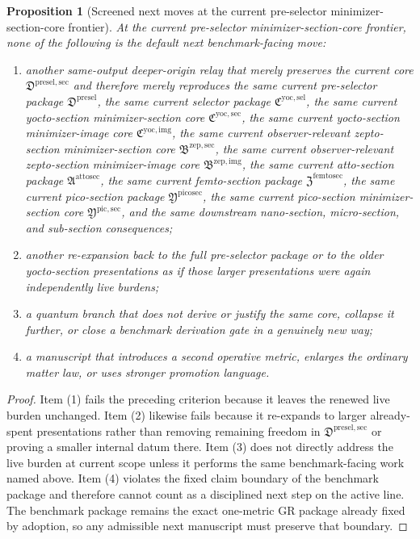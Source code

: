 \documentclass[11pt]{article}
\newcommand{\PreSelectorPackage}{\mathfrak D^{\mathrm{presel}}}
\newcommand{\PreSelectorMinSectionCore}{\mathfrak D^{\mathrm{presel,sec}}}
\newcommand{\YoctoSelectorPackage}{\mathfrak C^{\mathrm{yoc,sel}}}
\newcommand{\YoctoImageCore}{\mathfrak C^{\mathrm{yoc,img}}}
\newcommand{\YoctoMinSectionCore}{\mathfrak C^{\mathrm{yoc,sec}}}
\newcommand{\ZeptoImageCore}{\mathfrak B^{\mathrm{zep,img}}}
\newcommand{\ZeptoMinSectionCore}{\mathfrak B^{\mathrm{zep,sec}}}
\newcommand{\AttoSectionPackage}{\mathfrak A^{\mathrm{attosec}}}
\newcommand{\FemtoSectionPackage}{\mathfrak Z^{\mathrm{femtosec}}}
\newcommand{\PicoSectionPackage}{\mathfrak Y^{\mathrm{picosec}}}
\newcommand{\PicoMinSectionCore}{\mathfrak Y^{\mathrm{pic,sec}}}
\newtheorem{proposition}{Proposition}
\begin{document}
\begin{proposition}[Screened next moves at the current pre-selector minimizer-section-core frontier]
At the current pre-selector minimizer-section-core frontier, none of the following is the default next benchmark-facing move:
\begin{enumerate}
    \item another same-output deeper-origin relay that merely preserves the current core \(\PreSelectorMinSectionCore\) and therefore merely reproduces the same current pre-selector package \(\PreSelectorPackage\), the same current selector package \(\YoctoSelectorPackage\), the same current yocto-section minimizer-section core \(\YoctoMinSectionCore\), the same current yocto-section minimizer-image core \(\YoctoImageCore\), the same current observer-relevant zepto-section minimizer-section core \(\ZeptoMinSectionCore\), the same current observer-relevant zepto-section minimizer-image core \(\ZeptoImageCore\), the same current atto-section package \(\AttoSectionPackage\), the same current femto-section package \(\FemtoSectionPackage\), the same current pico-section package \(\PicoSectionPackage\), the same current pico-section minimizer-section core \(\PicoMinSectionCore\), and the same downstream nano-section, micro-section, and sub-section consequences;
    \item another re-expansion back to the full pre-selector package or to the older yocto-section presentations as if those larger presentations were again independently live burdens;
    \item a quantum branch that does not derive or justify the same core, collapse it further, or close a benchmark derivation gate in a genuinely new way;
    \item a manuscript that introduces a second operative metric, enlarges the ordinary matter law, or uses stronger promotion language.
\end{enumerate}
\end{proposition}

\begin{proof}
Item (1) fails the preceding criterion because it leaves the renewed live burden unchanged. Item (2) likewise fails because it re-expands to larger already-spent presentations rather than removing remaining freedom in \(\PreSelectorMinSectionCore\) or proving a smaller internal datum there. Item (3) does not directly address the live burden at current scope unless it performs the same benchmark-facing work named above. Item (4) violates the fixed claim boundary of the benchmark package and therefore cannot count as a disciplined next step on the active line. The benchmark package remains the exact one-metric GR package already fixed by adoption, so any admissible next manuscript must preserve that boundary.
\end{proof}
\end{document}
